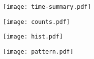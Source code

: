 \documentclass[11pt,letterpaper,twocolumn]{article}
\begin{document}
\selectfont

\pagestyle{fancy}

\begin{figure}[!h]
\vspace{-11pt}
\centering

\vspace{11pt}
\end{figure}

\begin{figure}[!h]
\vspace{-5pt}
\centering
\texttt{[image: time-summary.pdf]}
\end{figure}

\begin{figure}[!h]
\vspace{8pt}
\centering
\texttt{[image: counts.pdf]}
\end{figure}
\begin{figure}[!h]
\vspace{8pt}
\centering
\texttt{[image: hist.pdf]}
\end{figure}

\begin{figure}[!h]
\vspace{-100pt}
\centering
\texttt{[image: pattern.pdf]}
\end{figure}

\begin{figure}[!h]
\centering

\end{figure}

%
%
\end{document}
